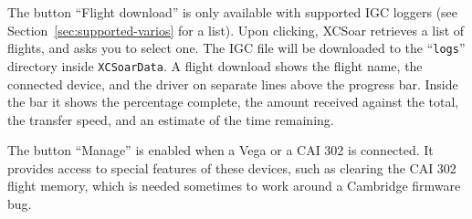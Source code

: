 The button ``Flight download'' is only available with supported IGC
loggers (see Section~\ref{sec:supported-varios} for a list).  Upon clicking,
XCSoar retrieves a list of flights, and asks you to select one.  The
IGC file will be downloaded to the ``\texttt{logs}'' directory inside
\texttt{XCSoarData}.  A flight download shows the flight name, the connected device, and the
driver on separate lines above the progress bar.  Inside the bar it
shows the percentage complete, the amount received against the total,
the transfer speed, and an estimate of the time remaining.

The button ``Manage'' is enabled when a Vega or a CAI 302 is
connected.  It provides access to special features of these devices,
such as clearing the CAI 302 flight memory, which is needed sometimes
to work around a Cambridge firmware bug.
